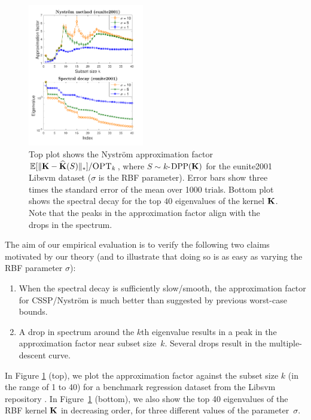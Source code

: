 \documentclass{article}
\begin{document}
\begin{figure}[t]
   \centering
  \includegraphics[width=0.45\textwidth]{figs/nystrom/rbf-eunite2001-double}

  \caption{Top plot shows the Nystr\"om approximation factor $\mathbb E[\|\mathbf K-{\widehat{\mathbf K}}(S)\|_*]/{\textsc{OPT}_k}$,
    where $S\sim k$-${\mathrm{DPP}}(\mathbf K)$ for the eunite2001 Libsvm dataset ($\sigma$ is the RBF parameter). Error bars show three times the standard
    error  of the mean over 1000 trials. Bottom plot shows the spectral decay for  the
  top $40$ eigenvalues of the kernel $\mathbf K$. Note that the
  peaks in the approximation factor align with the drops in
  the spectrum.}
  \label{f:rbf}
\end{figure}



The aim of our empirical evaluation is to verify the following two claims motivated by our theory (and to illustrate that doing so is as easy as varying the RBF parameter $\sigma$):
\begin{enumerate}
  \item When the spectral decay is sufficiently slow/smooth, the
    approximation factor for CSSP/Nystr\"om is much better than
    suggested by previous worst-case bounds.
  \item  A drop in spectrum around the $k$th eigenvalue results in
    a peak in the approximation factor near
    subset size~$k$. Several drops result in the
    multiple-descent curve.
  \end{enumerate}
In Figure \ref{f:rbf} (top), we plot the approximation factor against
the subset size $k$ (in the range of 1 to 40) for a benchmark regression dataset from the Libsvm repository
\citep[\emph{eunite2001}, see][]{libsvm}. 
In Figure~\ref{f:rbf} (bottom), we also show the top
40 eigenvalues of the RBF kernel $\mathbf K$ in decreasing order, for
three different values of the parameter~$\sigma$.  
\end{document}
